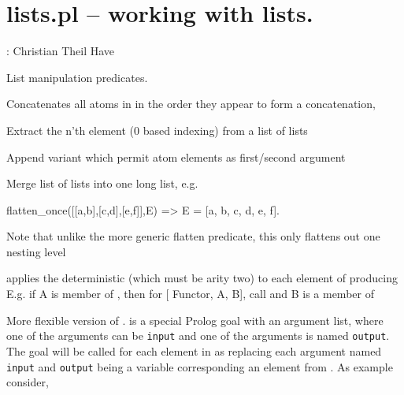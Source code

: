 


\section{lists.pl -- working with lists.}

\label{sec:lists}

\begin{tags}
: Christian Theil Have
\end{tags}

List manipulation predicates.\vspace{0.7cm}

\begin{description}
Concatenates all atoms in  in the order they appear
to form a concatenation, 

Extract the n'th element (0 based indexing) from a list of lists

Append variant which permit atom elements as first/second argument

Merge list of lists into one long list, e.g.

\begin{code}
flatten_once([[a,b],[c,d],[e,f]],E) => E = [a, b, c, d, e, f].
\end{code}

Note that unlike the more generic flatten predicate, this only flattens out
one nesting level

applies the deterministic  (which must be arity two) to each element of  producing 
E.g. if A is member of , then for  \Suniv{} [ Functor, A, B], call  and B is a member of 

More flexible version of .
 is a special Prolog goal with an argument list, where one of the arguments can be \verb$input$ and
one of the arguments is named \verb$output$. The goal will be called for each element in  as replacing
each argument named \verb$input$ and \verb$output$ being a variable corresponding an element from .
As example consider,


\end{description}
